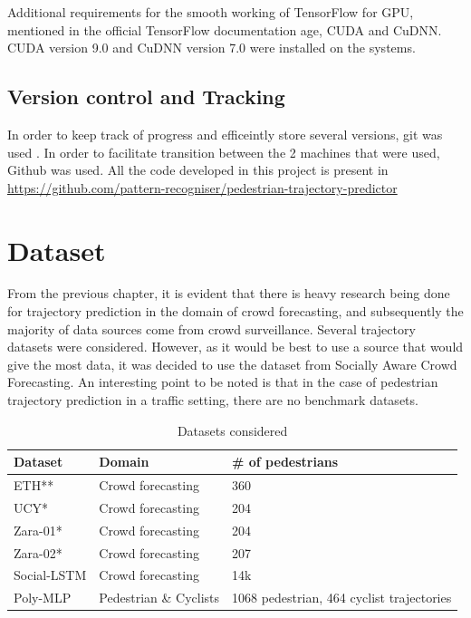 Additional requirements for the smooth working of TensorFlow for GPU, mentioned in the official TensorFlow documentation age, CUDA and CuDNN. CUDA version 9.0 and CuDNN version 7.0 were installed on the systems.



\subsection{Version control and Tracking}
In order to keep track of progress and efficeintly store several versions, git was used . In order to facilitate transition between the 2 machines that were used, Github was used. All the code developed in this project is present in \url{https://github.com/pattern-recogniser/pedestrian-trajectory-predictor}

\section{Dataset}
From the previous chapter, it is evident that there is heavy research being done for trajectory prediction in the domain of crowd forecasting, and subsequently the majority of data sources come from crowd surveillance. 
Several trajectory datasets were considered. However, as it would be best to use a source that would give the most data, it was decided to use the dataset from Socially Aware Crowd Forecasting. 
An interesting point to be noted is that in the case of pedestrian trajectory prediction in a traffic setting, there are no benchmark datasets.
\begin{table}[h]
\begin{tabular}{|l|l|l|}
\hline
Dataset     & Domain            & \# of pedestrians \\
\hline
ETH**       & Crowd forecasting      & 360          \\
\hline
UCY*        & Crowd forecasting      & 204          \\
\hline
Zara-01*    & Crowd forecasting      & 204          \\
\hline
Zara-02*    & Crowd forecasting      & 207          \\
\hline
Social-LSTM & Crowd forecasting      & 14k          \\
\hline
Poly-MLP    & Pedestrian \& Cyclists & 1068 pedestrian, 464 cyclist trajectories\\
\hline
\end{tabular}
\caption{Datasets considered}
\label{table:dataset_considered}

\end{table}

